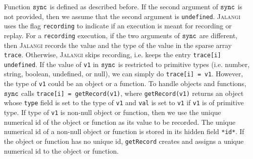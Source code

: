 \documentclass{sig-alternate}
\def\jalangi{\textsc{Jalangi}}
\newcommand \dsl [1] {\ensuremath{{\tt #1}}\xspace}
\newcommand \Sync{\dsl{sync}}
\begin{document}
Function $\Sync$ is defined as described before.  If the second
argument of $\Sync$ is not provided, then we assume that the second
argument is \texttt{undefined}.  \jalangi{} uses the flag
\texttt{recording} to indicate if an execution is meant for recording
or replay.  For a \texttt{recording} execution, if the two arguments
of $\Sync$ are different, then \jalangi{} records the value and the
type of the value in the sparse array \texttt{trace}.  Otherwise,
\jalangi{} skips recording, i.e. keeps the entry \texttt{trace[i]}
\texttt{undefined}.  If the value of \texttt{v1} in $\Sync$ is
restricted to primitive types (i.e. number, string, boolean,
undefined, or null), we can simply do \texttt{trace[i] = v1}.
However, the type of \texttt{v1} could be an object or a function.  To
handle objects and functions, $\Sync$ calls \texttt{trace[i] =
  getRecord(v1)}, where \texttt{getRecord(v1)} returns an object whose
\texttt{type} field is set to the type of \texttt{v1} and \texttt{val}
is set to \texttt{v1} if \texttt{v1} is of primitive type.  If type of
\texttt{v1} is non-null object or function, then we use the unique
numerical id of the object or function as its value to be recorded.
The unique numerical id of a non-null object or function is stored in
its hidden field \texttt{*id*}.  If the object or function has no
unique id, \texttt{getRecord} creates and assigns a unique numerical
id to the object or function.
\end{document}
